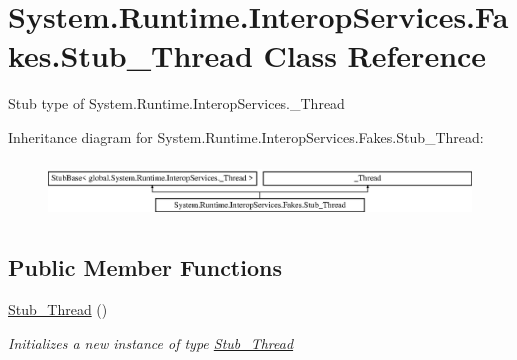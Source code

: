 \hypertarget{class_system_1_1_runtime_1_1_interop_services_1_1_fakes_1_1_stub___thread}{\section{System.\-Runtime.\-Interop\-Services.\-Fakes.\-Stub\-\_\-\-Thread Class Reference}
\label{class_system_1_1_runtime_1_1_interop_services_1_1_fakes_1_1_stub___thread}
}


Stub type of System.\-Runtime.\-Interop\-Services.\-\_\-\-Thread 


Inheritance diagram for System.\-Runtime.\-Interop\-Services.\-Fakes.\-Stub\-\_\-\-Thread\-:\begin{figure}[H]
\begin{center}
\leavevmode
\includegraphics[height=1.525886cm]{class_system_1_1_runtime_1_1_interop_services_1_1_fakes_1_1_stub___thread}
\end{center}
\end{figure}
\subsection*{Public Member Functions}
\begin{DoxyCompactItemize}
\item 
\hyperlink{class_system_1_1_runtime_1_1_interop_services_1_1_fakes_1_1_stub___thread_a660f037bb89f8c103fd7057d6953ba4b}{Stub\-\_\-\-Thread} ()
\begin{DoxyCompactList}\small\item\em Initializes a new instance of type \hyperlink{class_system_1_1_runtime_1_1_interop_services_1_1_fakes_1_1_stub___thread}{Stub\-\_\-\-Thread}\end{DoxyCompactList}\end{DoxyCompactItemize}
